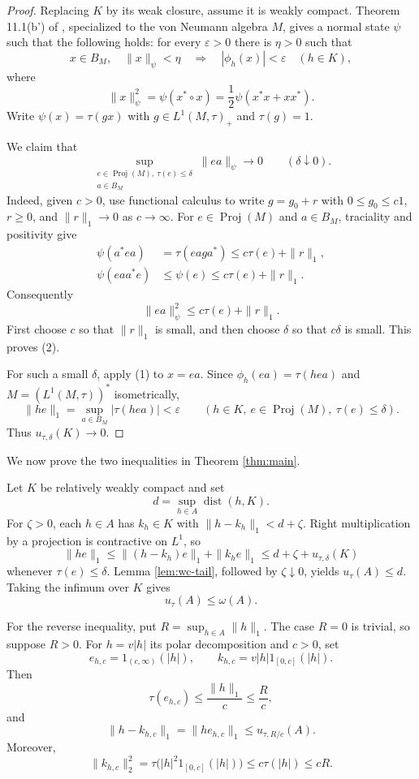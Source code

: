 \documentclass[11pt]{article}
\newcommand{\Proj}{\operatorname{Proj}}
\newcommand{\dist}{\operatorname{dist}}
\newcommand{\ud}{u_{\tau,\delta}}
\newcommand{\uu}{u_\tau}
\begin{document}
\begin{proof}
Replacing $K$ by its weak closure, assume it is weakly compact. Theorem
11.1(b') of \cite{HKPP}, specialized to the von Neumann algebra $M$, gives a
normal state $\psi$ such that the following holds: for every $\varepsilon>0$
there is $\eta>0$ such that
\[
 x\in B_M,\quad \|x\|_\psi<\eta
 \quad\Longrightarrow\quad
 |\phi_h(x)|<\varepsilon\quad(h\in K),                         \tag{1}
\]
where
\[
 \|x\|_\psi^2=\psi(x^*\circ x)
 =\frac12\psi(x^*x+xx^*).
\]
Write $\psi(x)=\tau(gx)$ with $g\in L^1(M,\tau)_+$ and $\tau(g)=1$.

We claim that
\[
 \sup_{\substack{e\in\Proj(M),\ \tau(e)\leq\delta\\a\in B_M}}
 \|ea\|_\psi\longrightarrow0\qquad(\delta\downarrow0).       \tag{2}
\]
Indeed, given $c>0$, use functional calculus to write $g=g_0+r$ with
$0\leq g_0\leq c1$, $r\geq0$, and $\|r\|_1\to0$ as $c\to\infty$.
For $e\in\Proj(M)$ and $a\in B_M$, traciality and positivity give
\begin{align*}
 \psi(a^*ea)&=\tau(eaga^*)\leq c\tau(e)+\|r\|_1,\\
 \psi(eaa^*e)&\leq\psi(e)\leq c\tau(e)+\|r\|_1.
\end{align*}
Consequently
\[
 \|ea\|_\psi^2\leq c\tau(e)+\|r\|_1.
\]
First choose $c$ so that $\|r\|_1$ is small, and then choose $\delta$ so that
$c\delta$ is small. This proves (2).

For such a small $\delta$, apply (1) to $x=ea$. Since
$\phi_h(ea)=\tau(hea)$ and $M=(L^1(M,\tau))^*$ isometrically,
\[
 \|he\|_1=\sup_{a\in B_M}|\tau(hea)|<\varepsilon
 \qquad(h\in K,\ e\in\Proj(M),\ \tau(e)\leq\delta).
\]
Thus $\ud(K)\to0$.
\end{proof}

We now prove the two inequalities in Theorem \ref{thm:main}.

Let $K$ be relatively weakly compact and set
\[
 d=\sup_{h\in A}\dist(h,K).
\]
For $\zeta>0$, each $h\in A$ has $k_h\in K$ with
$\|h-k_h\|_1<d+\zeta$. Right multiplication by a projection is contractive
on $L^1$, so
\[
 \|he\|_1\leq \|(h-k_h)e\|_1+\|k_he\|_1
 \leq d+\zeta+\ud(K)
\]
whenever $\tau(e)\leq\delta$. Lemma \ref{lem:wc-tail}, followed by
$\zeta\downarrow0$, yields $\uu(A)\leq d$. Taking the infimum over $K$ gives
\[
 \uu(A)\leq\omega(A).                                        \tag{3}
\]

For the reverse inequality, put $R=\sup_{h\in A}\|h\|_1$. The case $R=0$
is trivial, so suppose $R>0$. For $h=v|h|$ its polar decomposition and $c>0$,
set
\[
 e_{h,c}=1_{(c,\infty)}(|h|),\qquad
 k_{h,c}=v|h|1_{[0,c]}(|h|).
\]
Then
\[
 \tau(e_{h,c})\leq\frac{\|h\|_1}{c}\leq\frac Rc,             \tag{4}
\]
and
\[
 \|h-k_{h,c}\|_1=\|he_{h,c}\|_1\leq u_{\tau,R/c}(A).         \tag{5}
\]
Moreover,
\[
 \|k_{h,c}\|_2^2
 =\tau\bigl(|h|^2 1_{[0,c]}(|h|)\bigr)
 \leq c\tau(|h|)\leq cR.                                    \tag{6}
\]
\end{document}
